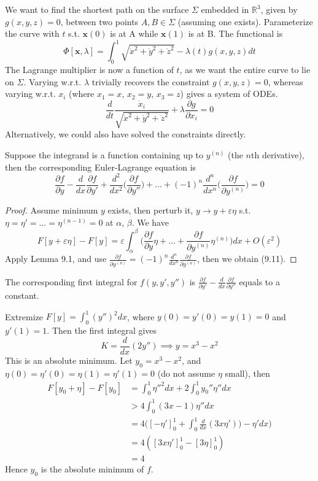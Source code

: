 \documentclass[a4paper]{article}
\begin{document}
\begin{eg}
We want to find the shortest path on the surface $\Sigma$ embedded in $\mathbb{R}^3$, given by $g(x,y,z)=0$, between two points $A,B\in\Sigma$ (assuming one exists). Parameterize the curve with $t$ s.t. $\mathbf{x}(0)$ is at A while $\mathbf{x}(1)$ is at B. The functional is
$$\Phi[\mathbf{x},\lambda]=\int_0^1\sqrt{\dot{x}^2+\dot{y}^2+\dot{z}^2}-\lambda(t)g(x,y,z)dt$$
The Lagrange multiplier is now a function of $t$, as we want the entire curve to lie on $\Sigma$. Varying w.r.t. $\lambda$ trivially recovers the constraint $g(x,y,z)=0$, whereas varying w.r.t. $x_i$ (where $x_1=x$, $x_2=y$, $x_3=z$) gives a system of ODEs.
$$\frac{d}{dt}\frac{\dot{x}_i}{\sqrt{\dot{x}^2+\dot{y}^2+\dot{z}^2}}+\lambda\frac{\partial g}{\partial x_i}=0$$
Alternatively, we could also have solved the constraints directly.
\end{eg}
\begin{prop}
Suppose the integrand is a function containing up to $y^{(n)}$ (the $n$th derivative), then the corresponding Euler-Lagrange equation is
\begin{equation}
    \frac{\partial f}{\partial y}-\frac{d}{dx}\frac{\partial f}{\partial y'}+\frac{d^2}{dx^2}\bigg(\frac{\partial f}{\partial y''}\bigg)+\dots+(-1)^n\frac{d^n}{dx^n}\bigg(\frac{\partial f}{\partial y^{(n)}}\bigg)=0\tag{9.11}
\end{equation}
\end{prop}
\begin{proof}
Assume minimum $y$ exists, then perturb it, $y\rightarrow y+\varepsilon\eta$ s.t. $\eta=\eta'=\dots=\eta^{(n-1)}=0$ at $\alpha$, $\beta$. We have
$$F[y+\varepsilon\eta]-F[y]=\varepsilon\int_\alpha^\beta\bigg(\frac{\partial f}{\partial y}\eta+\dots+\frac{\partial f}{\partial y^{(n)}}\eta^{(n)}\bigg)dx+O(\varepsilon^2)$$
Apply Lemma 9.1, and use $\frac{\partial f}{\partial y^{(n)}}=(-1)^n\frac{d^n}{dx^n}\frac{\partial f}{\partial y^{(n)}}$, then we obtain (9.11).
\end{proof}
\begin{eg}
The corresponding first integral for $f(y,y',y'')$ is $\frac{\partial f}{\partial y'}-\frac{d}{dx}\frac{\partial f}{\partial y''}$ equals to a constant.
\end{eg}
\begin{eg}
Extremize $F[y]=\int_0^1(y'')^2dx$, where $y(0)=y'(0)=y(1)=0$ and $y'(1)=1$. Then the first integral gives
$$K=\frac{d}{dx}(2y'')\implies y=x^3-x^2$$
This is an absolute minimum. Let $y_0=x^3-x^2$, and $\eta(0)=\eta'(0)=\eta(1)=\eta'(1)=0$ (do not assume $\eta$ small), then
\begin{align}
    F[y_0+\eta]-F[y_0]&=\int_0^1\eta''^2dx+2\int_0^1y_0''\eta''dx\nonumber\\&>4\int_0^1(3x-1)\eta''dx\nonumber\\&=4\bigg([-\eta']_0^1+\int_0^1\frac{d}{dx}(3x\eta'))-\eta'dx\bigg)\nonumber\\&=4([3x\eta']_0^1-[3\eta]_0^1)\nonumber\\&=4\nonumber
\end{align}
Hence $y_0$ is the absolute minimum of $f$.
\end{eg}
\newpage
\end{document}
